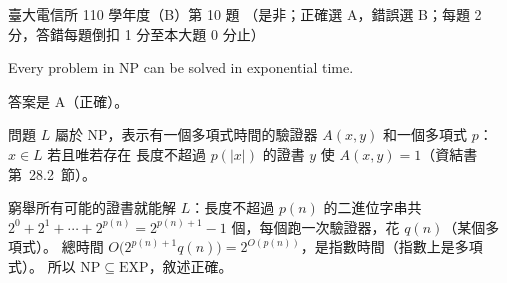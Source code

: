 \begin{pastexam}[label={px:ntu-110-comm-dsa-10}]{臺大電信所 110 學年度（B）第 10 題}
（是非；正確選 A，錯誤選 B；每題 2 分，答錯每題倒扣 1 分至本大題 0 分止）

Every problem in NP can be solved in exponential time.
\end{pastexam}

\begin{pastsoln}
答案是 A（正確）。

問題 $L$ 屬於 NP，表示有一個多項式時間的驗證器 $A(x, y)$ 和一個多項式 $p$：$x \in L$ 若且唯若存在
長度不超過 $p(|x|)$ 的證書 $y$ 使 $A(x, y) = 1$（資結書第~28.2~節）。

窮舉所有可能的證書就能解 $L$：長度不超過 $p(n)$ 的二進位字串共
$2^0 + 2^1 + \cdots + 2^{p(n)} = 2^{p(n)+1} - 1$ 個，每個跑一次驗證器，花 $q(n)$（某個多項式）。
總時間 $O\big(2^{p(n)+1} q(n)\big) = 2^{O(p(n))}$，是指數時間（指數上是多項式）。 所以
$\mathrm{NP} \subseteq \mathrm{EXP}$，敘述正確。
\end{pastsoln}
